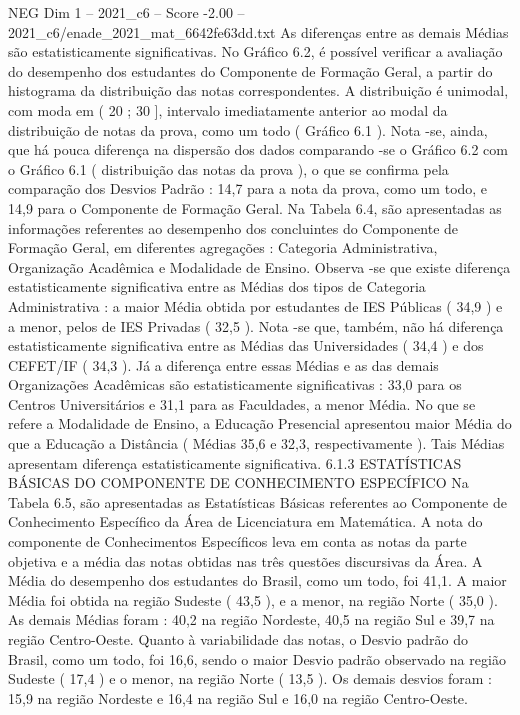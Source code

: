 \begin{textsample}{NEG Dim 1 – 2021\_c6 – Score -2.00 – 2021\_c6/enade\_2021\_mat\_6642fe63dd.txt}
As diferenças entre as demais Médias são estatisticamente significativas.
No Gráfico 6.2, é possível verificar a avaliação do desempenho dos estudantes do Componente de Formação Geral, a partir do histograma da distribuição das notas correspondentes.
A distribuição é unimodal, com moda em ( 20 ; 30 ], intervalo imediatamente anterior ao modal da distribuição de notas da prova, como um todo ( Gráfico 6.1 ).
Nota -se, ainda, que há pouca diferença na dispersão dos dados comparando -se o Gráfico 6.2 com o Gráfico 6.1 ( distribuição das notas da prova ), o que se confirma pela comparação dos Desvios Padrão : 14,7 para a nota da prova, como um todo, e 14,9 para o Componente de Formação Geral.
Na Tabela 6.4, são apresentadas as informações referentes ao desempenho dos concluintes do Componente de Formação Geral, em diferentes agregações : Categoria Administrativa, Organização Acadêmica e Modalidade de Ensino.
Observa -se que existe diferença estatisticamente significativa entre as Médias dos tipos de Categoria Administrativa : a maior Média obtida por estudantes de IES Públicas ( 34,9 ) e a menor, pelos de IES Privadas ( 32,5 ).
Nota -se que, também, não há diferença estatisticamente significativa entre as Médias das Universidades ( 34,4 ) e dos CEFET/IF ( 34,3 ).
Já a diferença entre essas Médias e as das demais Organizações Acadêmicas são estatisticamente significativas : 33,0 para os Centros Universitários e 31,1 para as Faculdades, a menor Média.
No que se refere a Modalidade de Ensino, a Educação Presencial apresentou maior Média do que a Educação a Distância ( Médias 35,6 e 32,3, respectivamente ).
Tais Médias apresentam diferença estatisticamente significativa. 6.1.3 ESTATÍSTICAS BÁSICAS DO COMPONENTE DE CONHECIMENTO ESPECÍFICO Na Tabela 6.5, são apresentadas as Estatísticas Básicas referentes ao Componente de Conhecimento Específico da Área de Licenciatura em Matemática.
A nota do componente de Conhecimentos Específicos leva em conta as notas da parte objetiva e a média das notas obtidas nas três questões discursivas da Área.
A Média do desempenho dos estudantes do Brasil, como um todo, foi 41,1.
A maior Média foi obtida na região Sudeste ( 43,5 ), e a menor, na região Norte ( 35,0 ).
As demais Médias foram : 40,2 na região Nordeste, 40,5 na região Sul e 39,7 na região Centro-Oeste.
Quanto à variabilidade das notas, o Desvio padrão do Brasil, como um todo, foi 16,6, sendo o maior Desvio padrão observado na região Sudeste ( 17,4 ) e o menor, na região Norte ( 13,5 ).
Os demais desvios foram : 15,9 na região Nordeste e 16,4 na região Sul e 16,0 na região Centro-Oeste.

\end{textsample}
